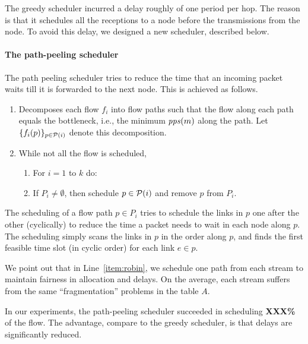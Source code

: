 \documentclass[12pt]{article}
\newenvironment{proof sketch}[1]{\noindent {\emph{Proof sketch of #1:}}}{\hfill \qed}
\newcommand{\pps}{\text{\emph{pps}}}
\begin{document}
 The greedy scheduler incurred a delay roughly of
  one period per hop. The reason is that it schedules all the
  receptions to a node before the transmissions from the node. To
  avoid this delay, we designed a new scheduler, described below.

\paragraph{The path-peeling scheduler}
The path peeling scheduler tries to reduce the time that an incoming
packet waits till it is forwarded to the next node. This is achieved
as follows.
\begin{enumerate}
\item Decomposes each flow $f_i$ into flow paths such that the flow
  along each path equals the bottleneck, i.e., the minimum $\pps(m)$ along the path.  Let
  $\{f_i(p)\}_{p\in {\cal{P}}(i)}$ denote this decomposition.
\item While not all the flow is scheduled,
  \begin{enumerate}
  \item \label{item:robin} For $i=1$ to $k$ do:
  \item If $P_i\neq \emptyset$, then schedule $p\in {\cal P}(i)$ and remove $p$ from $P_i$.
  \end{enumerate}
\end{enumerate}
The scheduling of a flow path $p\in P_i$ tries to schedule the links in
$p$ one after the other (cyclically) to reduce the time a packet needs to wait in each node
along $p$. The scheduling simply scans the links in $p$ in the order
along $p$, and finds the first feasible time slot (in cyclic order) for
each link $e\in p$.

We point out that in Line~\ref{item:robin}, we schedule one path from
each stream to maintain fairness in allocation and delays. On the average, each stream
suffers from the same ``fragmentation'' problems in the table $A$.

In our experiments, the path-peeling scheduler succeeded in scheduling
\textbf{XXX\%} of the flow. The advantage, compare to the greedy
scheduler, is that delays are significantly reduced.
\end{document}
